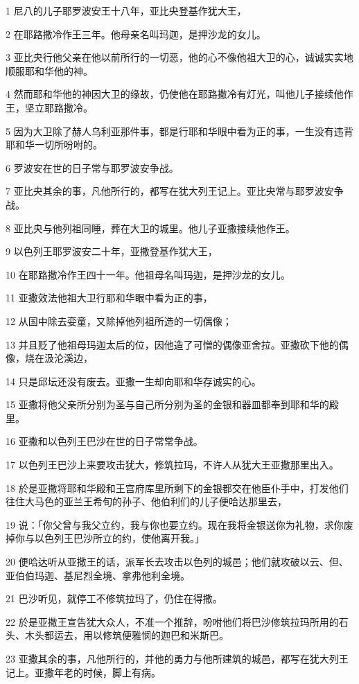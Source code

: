 \par 1 尼八的儿子耶罗波安王十八年，亚比央登基作犹大王，
\par 2 在耶路撒冷作王三年。他母亲名叫玛迦，是押沙龙的女儿。
\par 3 亚比央行他父亲在他以前所行的一切恶，他的心不像他祖大卫的心，诚诚实实地顺服耶和华他的神。
\par 4 然而耶和华他的神因大卫的缘故，仍使他在耶路撒冷有灯光，叫他儿子接续他作王，坚立耶路撒冷。
\par 5 因为大卫除了赫人乌利亚那件事，都是行耶和华眼中看为正的事，一生没有违背耶和华一切所吩咐的。
\par 6 罗波安在世的日子常与耶罗波安争战。
\par 7 亚比央其余的事，凡他所行的，都写在犹大列王记上。亚比央常与耶罗波安争战。
\par 8 亚比央与他列祖同睡，葬在大卫的城里。他儿子亚撒接续他作王。
\par 9 以色列王耶罗波安二十年，亚撒登基作犹大王，
\par 10 在耶路撒冷作王四十一年。他祖母名叫玛迦，是押沙龙的女儿。
\par 11 亚撒效法他祖大卫行耶和华眼中看为正的事，
\par 12 从国中除去娈童，又除掉他列祖所造的一切偶像；
\par 13 并且贬了他祖母玛迦太后的位，因他造了可憎的偶像亚舍拉。亚撒砍下他的偶像，烧在汲沦溪边，
\par 14 只是邱坛还没有废去。亚撒一生却向耶和华存诚实的心。
\par 15 亚撒将他父亲所分别为圣与自己所分别为圣的金银和器皿都奉到耶和华的殿里。
\par 16 亚撒和以色列王巴沙在世的日子常常争战。
\par 17 以色列王巴沙上来要攻击犹大，修筑拉玛，不许人从犹大王亚撒那里出入。
\par 18 於是亚撒将耶和华殿和王宫府库里所剩下的金银都交在他臣仆手中，打发他们往住大马色的亚兰王希旬的孙子、他伯利们的儿子便哈达那里去，
\par 19 说：「你父曾与我父立约，我与你也要立约。现在我将金银送你为礼物，求你废掉你与以色列王巴沙所立的约，使他离开我。」
\par 20 便哈达听从亚撒王的话，派军长去攻击以色列的城邑；他们就攻破以云、但、亚伯伯玛迦、基尼烈全境、拿弗他利全境。
\par 21 巴沙听见，就停工不修筑拉玛了，仍住在得撒。
\par 22 於是亚撒王宣告犹大众人，不准一个推辞，吩咐他们将巴沙修筑拉玛所用的石头、木头都运去，用以修筑便雅悯的迦巴和米斯巴。
\par 23 亚撒其余的事，凡他所行的，并他的勇力与他所建筑的城邑，都写在犹大列王记上。亚撒年老的时候，脚上有病。

